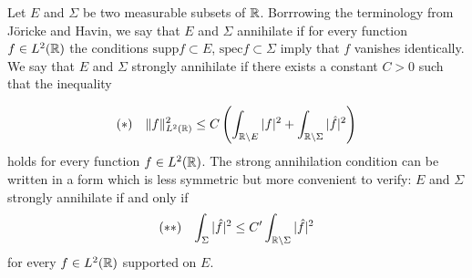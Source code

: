 Let $E$ and $\Sigma$ be two measurable subsets of $\mathbb{R}$. Borrrowing the terminology from J\"{o}ricke and Havin, we say that $E$ and $\Sigma$ annihilate if for every  function $f\in L^2(\mathbb{R})$ the conditions $\mathrm{supp}f\subset E$, $\mathrm{spec}f\subset \Sigma$ imply that $f$ vanishes identically. We say that $E$ and $\Sigma$ strongly annihilate if there exists a constant $C>0$ such that the inequality

\begin{equation*}
  \begin{aligned}
    (*)  & &  \|f\|^2_{L^2(\mathbb{R})}\le C\left( \int_{\mathbb{R}\backslash E}|f|^2+\int_{\mathbb{R}\backslash \Sigma}|\hat{f}|^2 \right) 
  \end{aligned}
\end{equation*}
holds for every function $f\in L^2(\mathbb{R})$. The strong annihilation condition can be written in a form which is less symmetric but more convenient to verify: $E$ and $\Sigma$ strongly annihilate if and only if 
  \begin{equation*}
    \begin{aligned}
      (**) & & \int_{\Sigma}|\hat{f}|^2\le C'\int_{\mathbb{R}\backslash \Sigma}|\hat{f}|^2
    \end{aligned}
  \end{equation*}
  for every $f\in L^2(\mathbb{R})$ supported on $E$.


